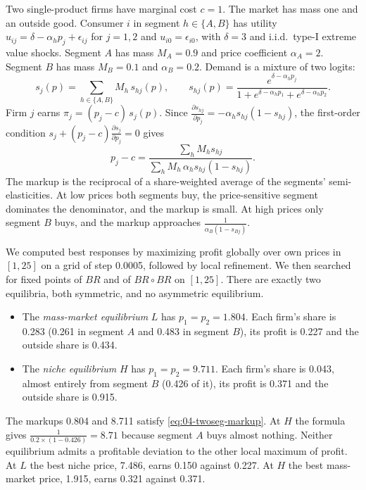 \begin{example}\label{ex:04-multiple-eq}
Two single-product firms have marginal cost $c = 1$. The market has mass one and an outside good. Consumer $i$ in
segment $h \in \{A, B\}$ has utility $u_{ij} = \delta - \alpha_h p_j + \epsilon_{ij}$ for $j = 1, 2$ and
$u_{i0} = \epsilon_{i0}$, with $\delta = 3$ and i.i.d.\ type-I extreme value shocks. Segment $A$ has mass $M_A = 0.9$
and price coefficient $\alpha_A = 2$. Segment $B$ has mass $M_B = 0.1$ and $\alpha_B = 0.2$. Demand is a mixture of
two logits:
\[
  s_j(p) = \sum_{h \in \{A, B\}} M_h\,s_{hj}(p), \qquad s_{hj}(p) = \frac{e^{\delta - \alpha_h p_j}}{1 + e^{\delta - \alpha_h p_1} + e^{\delta - \alpha_h p_2}}.
\]
Firm $j$ earns $\pi_j = (p_j - c)\,s_j(p)$. Since $\frac{\partial s_{hj}}{\partial p_j} = -\alpha_h s_{hj}(1 - s_{hj})$,
the first-order condition $s_j + (p_j - c)\frac{\partial s_j}{\partial p_j} = 0$ gives
\begin{equation}\label{eq:04-twoseg-markup}
  p_j - c = \frac{\sum_h M_h s_{hj}}{\sum_h M_h\,\alpha_h s_{hj}(1 - s_{hj})}.
\end{equation}
The markup is the reciprocal of a share-weighted average of the segments' semi-elasticities. At low prices both
segments buy, the price-sensitive segment dominates the denominator, and the markup is small. At high prices only
segment $B$ buys, and the markup approaches $\frac{1}{\alpha_B(1 - s_{Bj})}$.

We computed best responses by maximizing profit globally over own prices in $[1, 25]$ on a grid of step 0.0005,
followed by local refinement. We then searched for fixed points of $BR$ and of $BR \circ BR$ on $[1, 25]$. There are
exactly two equilibria, both symmetric, and no asymmetric equilibrium.
\begin{itemize}
  \item The \emph{mass-market equilibrium} $L$ has $p_1 = p_2 = 1.804$. Each firm's share is 0.283 (0.261 in segment
  $A$ and 0.483 in segment $B$), its profit is 0.227 and the outside share is 0.434.
  \item The \emph{niche equilibrium} $H$ has $p_1 = p_2 = 9.711$. Each firm's share is 0.043, almost entirely from
  segment $B$ (0.426 of it), its profit is 0.371 and the outside share is 0.915.
\end{itemize}
The markups 0.804 and 8.711 satisfy \eqref{eq:04-twoseg-markup}. At $H$ the formula gives
$\frac{1}{0.2 \times (1 - 0.426)} = 8.71$ because segment $A$ buys almost nothing. Neither equilibrium admits a
profitable deviation to the other local maximum of profit. At $L$ the best niche price, 7.486, earns 0.150 against
0.227. At $H$ the best mass-market price, 1.915, earns 0.321 against 0.371.


\end{example}
